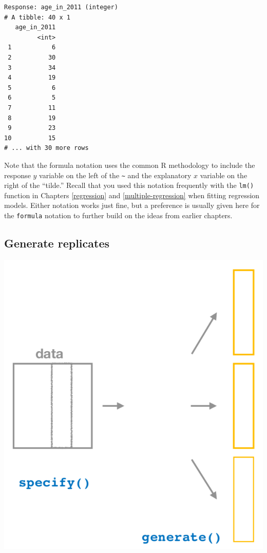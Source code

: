 \documentclass[12pt,]{krantz}
\begin{document}
\begin{verbatim}
Response: age_in_2011 (integer)
# A tibble: 40 x 1
   age_in_2011
         <int>
 1           6
 2          30
 3          34
 4          19
 5           6
 6           5
 7          11
 8          19
 9          23
10          15
# ... with 30 more rows
\end{verbatim}

Note that the formula notation uses the common R methodology to include
the response \(y\) variable on the left of the
\texttt{\textasciitilde{}} and the explanatory \(x\) variable on the
right of the ``tilde.'' Recall that you used this notation frequently
with the \texttt{lm()} function in Chapters \ref{regression} and
\ref{multiple-regression} when fitting regression models. Either
notation works just fine, but a preference is usually given here for the
\texttt{formula} notation to further build on the ideas from earlier
chapters.

\subsection{Generate replicates}\label{generate-replicates}

\begin{center}\includegraphics[width=\textwidth]{images/flowcharts/infer/generate} \end{center}
\end{document}
